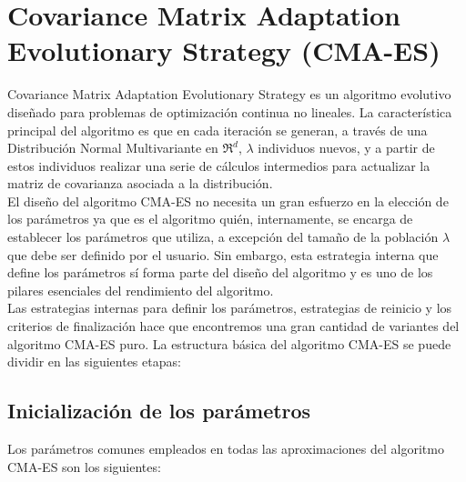 
\newpage

\section{Covariance Matrix Adaptation Evolutionary Strategy (CMA-ES)}
\label{sec:CMA}

Covariance Matrix Adaptation Evolutionary Strategy es un algoritmo evolutivo diseñado para problemas de optimización continua no lineales. 
La característica principal del algoritmo es que en cada iteración se generan, a través de una Distribución Normal Multivariante en $\Re^{d}$, $\lambda$ individuos nuevos, y a partir de estos individuos realizar una serie de cálculos intermedios para actualizar la matriz de covarianza asociada a la distribución. \\  
El diseño del algoritmo CMA-ES no necesita un gran esfuerzo en la elección de los parámetros ya que es el algoritmo quién, internamente, se encarga de establecer los parámetros que utiliza, a excepción del tamaño de la población $\lambda$ que debe ser definido por el usuario. Sin embargo, esta estrategia interna que define los parámetros sí forma parte del diseño del algoritmo y es uno de los pilares esenciales del rendimiento del algoritmo. \\

Las estrategias internas para definir los parámetros, estrategias de reinicio y los criterios de finalización hace que encontremos una gran cantidad de variantes del algoritmo CMA-ES puro. La estructura básica del algoritmo CMA-ES se puede dividir en las siguientes etapas: \\ 

\bigskip

\subsection{Inicialización de los parámetros}

Los parámetros comunes empleados en todas las aproximaciones del algoritmo CMA-ES son los siguientes: 

